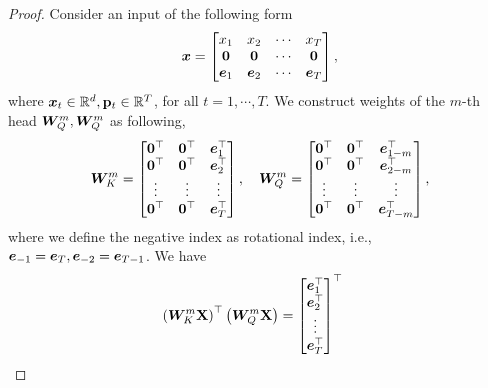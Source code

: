 \begin{proof}
    Consider an input of the following form
    \begin{equation*}
        \bm{x}
        =
        \begin{bmatrix}
            x_1 & x_2 & \cdots & x_T
            \\
            \bm{0} & \bm{0} & \cdots & \bm{0} 
            \\
            \bm{e}_1 & \bm{e}_2 & \cdots & \bm{e}_T
        \end{bmatrix},
    \end{equation*}
    where $\bm{x}_t \in \mathbb{R}^{d}, \mathbf{p}_t \in \mathbb{R}^T$, for all $t = 1, \cdots, T$.
    We construct weights of the $m$-th head $\bm{W}_Q^m, \bm{W}_Q^m$ as following,
    \begin{equation*}
        \bm{W}_K^m
        =
        \begin{bmatrix}
            \bm{0}^\top & \bm{0}^\top & \bm{e}_1^\top
            \\
            \bm{0}^\top & \bm{0}^\top & \bm{e}_2^\top
            \\
            \vdots & \vdots & \vdots 
            \\
            \bm{0}^\top & \bm{0}^\top & \bm{e}_T^\top            
        \end{bmatrix},
        \quad
        \bm{W}_Q^m
        =
        \begin{bmatrix}
            \bm{0}^\top & \bm{0}^\top & \bm{e}_{1-m}^\top
            \\
            \bm{0}^\top & \bm{0}^\top & \bm{e}_{2-m}^\top
            \\
            \vdots & \vdots & \vdots 
            \\
            \bm{0}^\top & \bm{0}^\top & \bm{e}_{T-m}^\top            
        \end{bmatrix},
    \end{equation*}
    where we define the negative index as rotational index, i.e., $\bm{e}_{-1} = \bm{e}_{T}, \bm{e}_{-2} = \bm{e}_{T-1}$.
    We have
    \begin{align*}
        \left(
        \bW_K^m
        \Xb
        \right)^\top
        \left(
        \bW_Q^m
        \Xb
        \right)
        &=
        \begin{bmatrix}
            \be_1^\top
            \\
            \be_2^\top
            \\
            \vdots 
            \\
            \be_T^\top
        \end{bmatrix}^\top

\end{align*}
\end{proof}
